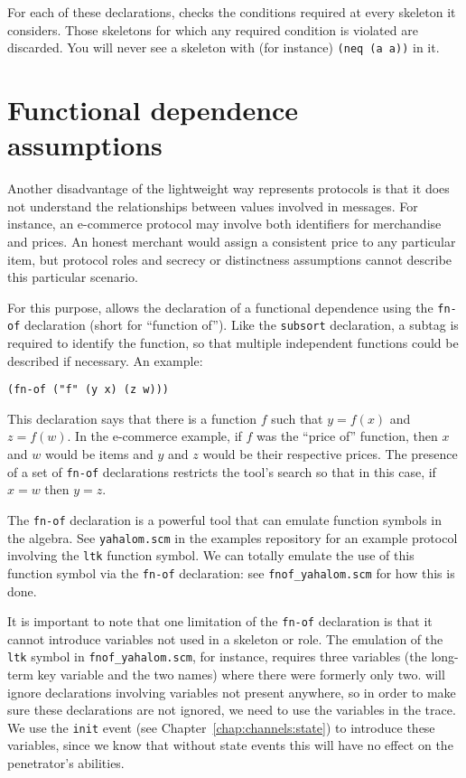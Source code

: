 For each of these declarations, {\cpsa} checks the conditions required
at every skeleton it considers.  Those skeletons for which any
required condition is violated are discarded.  You will never see a
skeleton with (for instance) \texttt{(neq (a a))} in it.

\section{Functional dependence assumptions}

Another disadvantage of the lightweight way {\cpsa} represents
protocols is that it does not understand the relationships between
values involved in messages.  For instance, an e-commerce protocol
may involve both identifiers for merchandise and prices.  An honest
merchant would assign a consistent price to any particular item,
but protocol roles and secrecy or distinctness assumptions cannot
describe this particular scenario.

 
For this purpose, {\cpsa} allows the declaration of a functional
dependence using the \texttt{fn-of} declaration (short for ``function
of'').  Like the \texttt{subsort} declaration, a subtag is required
to identify the function, so that multiple independent functions could
be described if necessary.  An example:

\begin{center}
\verb|(fn-of ("f" (y x) (z w)))|
\end{center}

This declaration says that there is a function $f$ such that $y=f(x)$
and $z=f(w)$.  In the e-commerce example, if $f$ was the ``price of''
function, then $x$ and $w$ would be items and $y$ and $z$ would be
their respective prices.  The presence of a set of \texttt{fn-of}
declarations restricts the tool's search so that in this case, if
$x = w$ then $y = z$.

The \texttt{fn-of} declaration is a powerful tool that can emulate
function symbols in the algebra.  See \texttt{yahalom.scm} in the
examples repository for an example protocol involving the \texttt{ltk}
function symbol.  We can totally emulate the use of this function symbol
via the \texttt{fn-of} declaration: see \texttt{fnof\_yahalom.scm} for how
this is done.

 It is important to note
that one limitation of the \texttt{fn-of} declaration is that it
cannot introduce variables not used in a skeleton or role.  The
emulation of the \texttt{ltk} symbol in \texttt{fnof\_yahalom.scm}, for
instance, requires three variables (the long-term key variable and the
two names) where there were formerly only two.  {\cpsa} will ignore
declarations involving variables not present anywhere, so in order to
make sure these declarations are not ignored, we need to use the
variables in the trace.  We use the \texttt{init} event (see
Chapter~\ref{chap:channels:state}) to introduce these variables, since we know
that without state events this will have no effect on the penetrator's
abilities.

